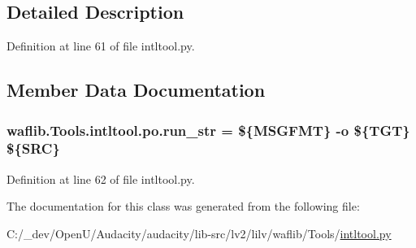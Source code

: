 \subsection{Detailed Description}


Definition at line 61 of file intltool.\+py.



\subsection{Member Data Documentation}
\subsubsection[{\texorpdfstring{run\+\_\+str}{run_str}}]{ waflib.\+Tools.\+intltool.\+po.\+run\+\_\+str = \textquotesingle{}\$\{M\+S\+G\+F\+MT\} -\/o \$\{T\+GT\} \$\{S\+RC\}\textquotesingle{}\hspace{0.3cm}{\ttfamily [static]}}\hypertarget{classwaflib_1_1_tools_1_1intltool_1_1po_af2c62931280d14856a0866a7b8e07220}{}\label{classwaflib_1_1_tools_1_1intltool_1_1po_af2c62931280d14856a0866a7b8e07220}


Definition at line 62 of file intltool.\+py.



The documentation for this class was generated from the following file\+:\begin{DoxyCompactItemize}
\item 
C\+:/\+\_\+dev/\+Open\+U/\+Audacity/audacity/lib-\/src/lv2/lilv/waflib/\+Tools/\hyperlink{lilv_2waflib_2_tools_2intltool_8py}{intltool.\+py}\end{DoxyCompactItemize}
